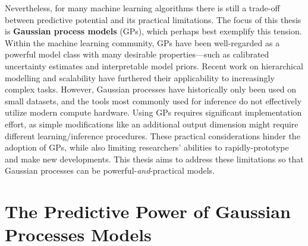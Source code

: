 Nevertheless, for many machine learning algorithms there is still a trade-off between predictive potential and its practical limitations.
The focus of this thesis is {\bf Gaussian process models} (GPs), which perhaps best exemplify this tension.
Within the machine learning community, GPs have been well-regarded as a powerful model class with many desirable properties---such as calibrated uncertainty estimates and interpretable model priors.
Recent work on hierarchical modelling \citep[e.g.][]{damianou2013deep} and scalability \citep[e.g.][]{wilson2015kernel} have furthered their applicability to increasingly complex tasks.
However, Gaussian processes have historically only been used on small datasets, and the tools most commonly used for inference do not effectively utilize modern compute hardware.
Using GPs requires significant implementation effort, as simple modifications like an additional output dimension might require different learning/inference procedures.
These practical considerations hinder the adoption of GPs, while also limiting researchers' abilities to rapidly-prototype and make new developments.
This thesis aims to address these limitations so that Gaussian processes can be powerful-\emph{and}-practical models.


\section{The Predictive Power of Gaussian Processes Models}

